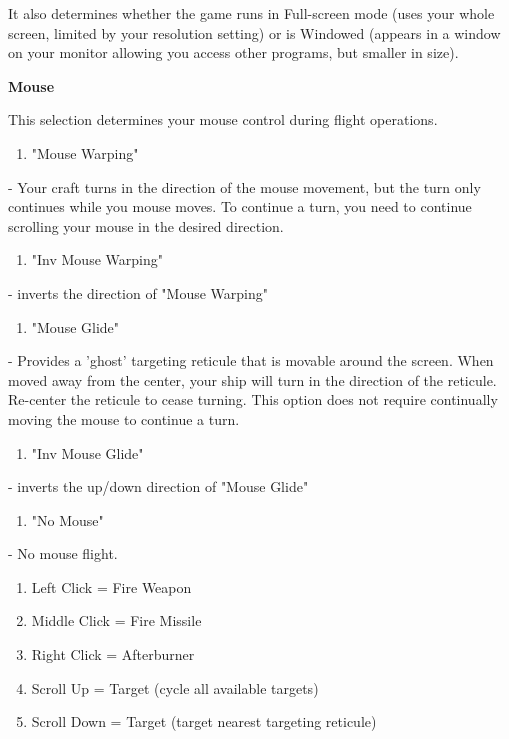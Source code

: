 \documentclass{article}
\begin{document}
It also determines whether the game runs in Full-screen mode (uses your whole screen, limited by your resolution setting) or is Windowed (appears in a window on your monitor allowing you access other programs, but smaller in size). 



\textbf{Mouse }

This selection determines your mouse control during flight operations.



\begin{enumerate}
\item  "Mouse Warping" 
\end{enumerate}

 - Your craft turns in the direction of the mouse movement, but the turn only continues while you  mouse moves. To continue a turn, you need to continue scrolling your mouse in the desired  direction. 

\begin{enumerate}
\item  "Inv Mouse Warping"
\end{enumerate}

 - inverts the direction of "Mouse Warping"

\begin{enumerate}
\item  "Mouse Glide" 
\end{enumerate}

 - Provides a 'ghost' targeting reticule that is movable around the screen. When moved away from  the center, your ship will turn in the direction of the reticule. Re-center the reticule to cease turning.  This option does not require continually moving the mouse to continue a turn. 

\begin{enumerate}
\item  "Inv Mouse Glide"
\end{enumerate}

 - inverts the up/down direction of "Mouse Glide"

\begin{enumerate}
\item  "No Mouse"
\end{enumerate}

 - No mouse flight. 




\begin{enumerate}
\item  Left Click = Fire Weapon 

\item  Middle Click  = Fire Missile 

\item  Right Click  = Afterburner 

\item  Scroll Up  = Target (cycle all available targets) 

\item  Scroll Down  = Target (target nearest targeting reticule)
\end{enumerate}
\end{document}
